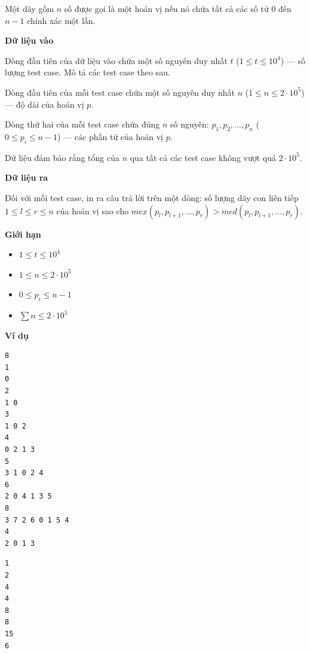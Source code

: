 \documentclass[12pt,a4paper]{article}
\newcommand{\inputformat}{%
  \vspace{6pt}\textbf{\textcolor{sectioncolor}{Dữ liệu vào}}\par\vspace{2pt}%
}
\newcommand{\outputformat}{%
  \vspace{6pt}\textbf{\textcolor{sectioncolor}{Dữ liệu ra}}\par\vspace{2pt}%
}
\newcommand{\constraints}{%
  \vspace{6pt}\textbf{\textcolor{sectioncolor}{Giới hạn}}\par\vspace{2pt}%
}
\newcommand{\example}{%
  \vspace{6pt}\textbf{\textcolor{sectioncolor}{Ví dụ}}\par\vspace{2pt}%
}
\begin{document}
Một dãy gồm $n$ số được gọi là một hoán vị nếu nó chứa tất cả các số từ $0$ đến $n - 1$ chính xác một lần.

\inputformat
\begin{inputbox}
Dòng đầu tiên của dữ liệu vào chứa một số nguyên duy nhất $t$ ($1 \le t \le 10^4$) --- số lượng test case. Mô tả các test case theo sau.

Dòng đầu tiên của mỗi test case chứa một số nguyên duy nhất $n$ ($1 \le n \le 2 \cdot 10^5$) --- độ dài của hoán vị $p$.

Dòng thứ hai của mỗi test case chứa đúng $n$ số nguyên: $p_1, p_2, \ldots, p_n$ ($0 \le p_i \le n - 1$) --- các phần tử của hoán vị $p$.

Dữ liệu đảm bảo rằng tổng của $n$ qua tất cả các test case không vượt quá $2 \cdot 10^5$.
\end{inputbox}

\outputformat
\begin{outputbox}
Đối với mỗi test case, in ra câu trả lời trên một dòng: số lượng dãy con liên tiếp $1 \le l \le r \le n$ của hoán vị sao cho $mex(p_l, p_{l+1}, \ldots, p_r) > med(p_l, p_{l+1}, \ldots, p_r)$.
\end{outputbox}

\constraints
\begin{constraintbox}
\begin{itemize}
    \item $1 \le t \le 10^4$
    \item $1 \le n \le 2 \cdot 10^5$
    \item $0 \le p_i \le n - 1$
    \item $\sum n \le 2 \cdot 10^5$
\end{itemize}
\end{constraintbox}

\example
\begin{lstlisting}
8
1
0
2
1 0
3
1 0 2
4
0 2 1 3
5
3 1 0 2 4
6
2 0 4 1 3 5
8
3 7 2 6 0 1 5 4
4
2 0 1 3
\end{lstlisting}
\begin{lstlisting}
1
2
4
4
8
8
15
6
\end{lstlisting}
\end{document}
